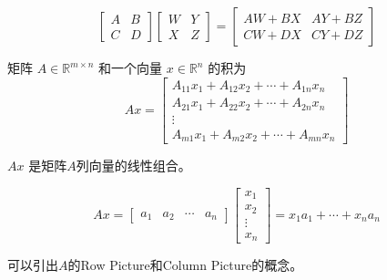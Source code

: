 \begin{definition}[分块矩阵乘法]
    \begin{equation} \left[\begin{array}{ll}A & B \\ {C} & D\end{array}\right]\left[\begin{array}{ll}W & Y \\ X & Z\end{array}\right]=\left[\begin{array}{ll}A W+B X & A Y+B Z \\ C W+D X & C Y+D Z\end{array}\right] \end{equation}
\end{definition}

\begin{definition}[矩阵-向量乘积 $Ax$]
    矩阵 $ A \in \mathbb{R}^{m \times n} $ 和一个向量 $ x \in \mathbb{R}^{n} $ 的积为
\begin{equation}
A x=\left[\begin{array}{c}
A_{11} x_{1}+A_{12} x_{2}+\cdots+A_{1 n} x_{n} \\
A_{21} x_{1}+A_{22} x_{2}+\cdots+A_{2 n} x_{n} \\
\vdots \\
A_{m 1} x_{1}+A_{m 2} x_{2}+\cdots+A_{m n} x_{n}
\end{array}\right]
\end{equation}
\end{definition}

\begin{corollary}
    $ {A} x $ 是矩阵$A$列向量的线性组合。

\begin{equation}
A x=\left[\begin{array}{llll}
a_{1} & a_{2} & \cdots & a_{n}
\end{array}\right]\left[\begin{array}{c}
x_{1} \\
x_{2} \\
\vdots \\
x_{n}
\end{array}\right]=x_{1} a_{1}+\cdots+x_{n} a_{n}
\end{equation}
\end{corollary}

可以引出$A$的Row Picture和Column Picture的概念。

